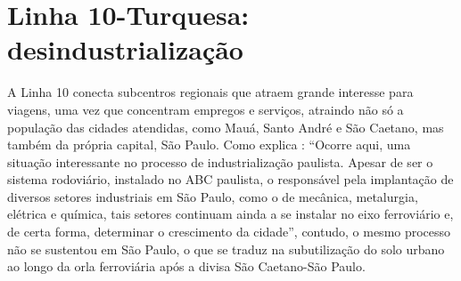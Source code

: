 	\begin{center}
	\end{center}
	
%
%
	\section{Linha 10-Turquesa: desindustrialização}
	
	A Linha 10 conecta subcentros regionais que atraem grande interesse para viagens, uma vez que concentram empregos e serviços, atraindo não só a população das cidades atendidas, como Mauá, Santo André e São Caetano, mas também da própria capital, São Paulo\cite[pág. 66]{Ferreira}. Como explica : ``Ocorre aqui, uma situação interessante no processo de industrialização paulista. Apesar de ser o sistema rodoviário, instalado no ABC paulista, o responsável pela implantação de diversos setores industriais em São Paulo, como o de mecânica, metalurgia, elétrica e química, tais setores continuam ainda a se 	instalar no eixo ferroviário e, de certa forma, determinar o crescimento da cidade'', contudo, o mesmo processo não se sustentou em São Paulo, o que se traduz na subutilização do solo urbano ao longo da orla ferroviária após a divisa São Caetano-São Paulo.
	
